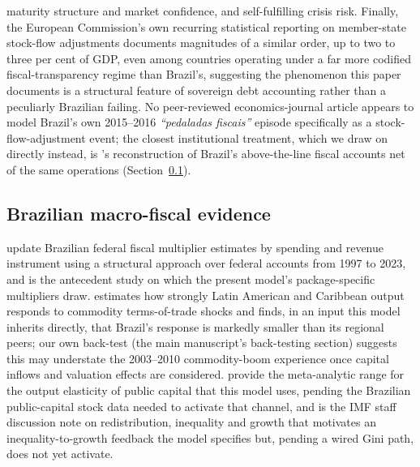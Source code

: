 \documentclass[11pt,a4paper]{article}
\begin{document}
maturity structure and market confidence, and self-fulfilling crisis risk. Finally, the European Commission's own recurring statistical reporting on member-state stock-flow adjustments \citep{eurostat2024sfa} documents magnitudes of a similar order, up to two to three per cent of GDP, even among countries operating under a far more codified fiscal-transparency regime than Brazil's, suggesting the phenomenon this paper documents is a structural feature of sovereign debt accounting rather than a peculiarly Brazilian failing. No peer-reviewed economics-journal article appears to model Brazil's own 2015--2016 \emph{``pedaladas fiscais''} episode specifically as a stock-flow-adjustment event; the closest institutional treatment, which we draw on directly instead, is \citet{gobettiorair2017}'s reconstruction of Brazil's above-the-line fiscal accounts net of the same operations (Section~\ref{sec:lit-brazil}).

\subsection{Brazilian macro-fiscal evidence}
\label{sec:lit-brazil}

\citet{sanches2026} update Brazilian federal fiscal multiplier estimates by spending and revenue instrument using a structural approach over federal accounts from 1997 to 2023, and \citet{carvalhosanches2019} is the antecedent study on which the present model's package-specific multipliers draw. \citet{gruss2014} estimates how strongly Latin American and Caribbean output responds to commodity terms-of-trade shocks and finds, in an input this model inherits directly, that Brazil's response is markedly smaller than its regional peers; our own back-test (the main manuscript's back-testing section) suggests this may understate the 2003--2010 commodity-boom experience once capital inflows and valuation effects are considered. \citet{bomligthart2014} provide the meta-analytic range for the output elasticity of public capital that this model uses, pending the Brazilian public-capital stock data needed to activate that channel, and \citet{ostrybergtsangarides2014} is the IMF staff discussion note on redistribution, inequality and growth that motivates an inequality-to-growth feedback the model specifies but, pending a wired Gini path, does not yet activate.
\end{document}
